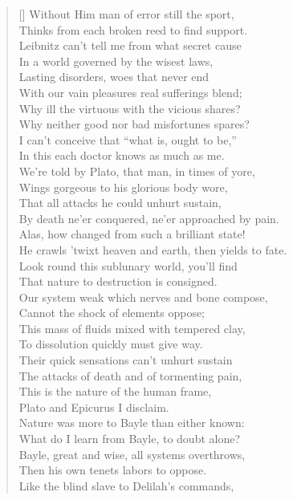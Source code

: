 \begin{verse}[\versewidth]
Without Him man of error still the sport,\\
Thinks from each broken reed to find support.\\
Leibnitz can't tell me from what secret cause\\
In a world governed by the wisest laws,\\
Lasting disorders, woes that never end\\
With our vain pleasures real sufferings blend;\\
Why ill the virtuous with the vicious shares?\\
Why neither good nor bad misfortunes spares?\\
I can't conceive that ``what is, ought to be,''\\
In this each doctor knows as much as me.\\
We're told by Plato, that man, in times of yore,\\
Wings gorgeous to his glorious body wore,\\
That all attacks he could unhurt sustain,\\
By death ne'er conquered, ne'er approached by pain.\\
Alas, how changed from such a brilliant state!\\
He crawls 'twixt heaven and earth, then yields to fate.\\
Look round this sublunary world, you'll find\\
That nature to destruction is consigned.\\
Our system weak which nerves and bone compose,\\
Cannot the shock of elements oppose;\\
This mass of fluids mixed with tempered clay,\\
To dissolution quickly must give way.\\
Their quick sensations can't unhurt sustain\\
The attacks of death and of tormenting pain,\\
This is the nature of the human frame,\\
Plato and Epicurus I disclaim.\\
Nature was more to Bayle than either known:\\
What do I learn from Bayle, to doubt alone?\\
Bayle, great and wise, all systems overthrows,\\
Then his own tenets labors to oppose.\\
Like the blind slave to Delilah's commands,\\

\end{verse}
